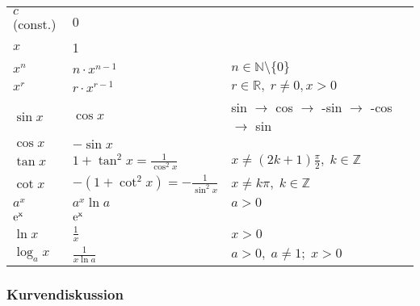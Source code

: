 \documentclass[6pt,a4paper]{scrartcl}
\begin{document}
\begin{multicols*}{2}
\begin{tabular}{l|l|l}
\hline
$ c $(const.)	& 0 																								\\	
$ x $			& 1																								\\
$ x^n $			& $ n \cdot x^{n-1} $						& $ n \in \mathbb N \setminus \{0\} $ 				\\
$ x^r $			& $ r \cdot x^{r-1} $						& $ r \in \mathbb R, \; r \neq 0, x>0 $ 				\\
$ \sin x $		& $ \cos x $ 								& sin $\rightarrow$ cos $\rightarrow$ -sin $\rightarrow$ -cos $\rightarrow$ sin\\	
$ \cos x $		& $ -\sin x $ 								&													\\
$ \tan x $		& $ 1+ \tan^2 x = \frac{1}{\cos^2 x} $		& $ x \neq (2k+1)\frac{\pi}{2}, \; k \in \mathbb Z $ 	\\
$ \cot x $		& $ -(1+ \cot^2 x) = - \frac{1}{\sin^2 x} $	& $ x \neq k \pi, \; k \in \mathbb Z $ 				\\
$ a^x $			& $ a^x \ln a $								& $ a>0 $ 											\\
$ \rm e^x $		& $ \rm e^x $ 								&													\\	
$ \ln x $		& $ \frac{1}{x} $							& $ x>0 $ 											\\
$ \log_a x $		& $ \frac{1}{x \ln a} $						& $ a>0, \; a \neq 1; \; x>0 $ 						\\
\end{tabular}

\subsubsection{Kurvendiskussion}


\end{multicols*}
\end{document}
